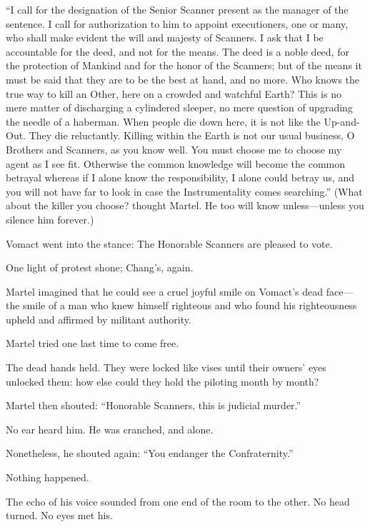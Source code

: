 ``I call for the designation of the Senior Scanner present as the manager of the sentence. I call for authorization to him to appoint executioners, one or many, who shall make evident the will and majesty of Scanners. I ask that I be accountable for the deed, and not for the means. The deed is a noble deed, for the protection of Mankind and for the honor of the Scanners; but of the means it must be said that they are to be the best at hand, and no more. Who knows the true way to kill an Other, here on a crowded and watchful Earth? This is no mere matter of discharging a cylindered sleeper, no mere question of upgrading the needle of a haberman. When people die down here, it is not like the Up-and-Out. They die reluctantly. Killing within the Earth is not our usual business, O Brothers and Scanners, as you know well. You must choose me to choose my agent as I see fit. Otherwise the common knowledge will become the common betrayal whereas if I alone know the responsibility, I alone could betray us, and you will not have far to look in case the Instrumentality comes searching.'' (What about the killer you choose? thought Martel. He too will know unless---unless you silence him forever.)

Vomact went into the stance: The Honorable Scanners are pleased to vote.

One light of protest shone; Chang's, again.

Martel imagined that he could see a cruel joyful smile on Vomact's dead face---the smile of a man who knew himself righteous and who found his righteousness upheld and affirmed by militant authority.

Martel tried one last time to come free.

The dead hands held. They were locked like vises until their owners' eyes unlocked them: how else could they hold the piloting month by month?

Martel then shouted: ``Honorable Scanners, this is judicial murder.''

No ear heard him. He was cranched, and alone.

Nonetheless, he shouted again: ``You endanger the Confraternity.''

Nothing happened.

The echo of his voice sounded from one end of the room to the other. No head turned. No eyes met his.

